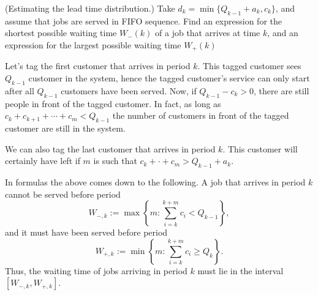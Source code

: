 \begin{question} (Estimating the lead time distribution.)  Take
  $d_k = \min\{Q_{k-1}+a_k, c_k\}$, and assume that jobs are served in
  FIFO sequence. Find an expression for the shortest possible waiting
  time $W_-(k)$ of a job that arrives at time $k$, and an expression
  for the largest possible waiting time $W_+(k)$
    \begin{solution}
      Let's tag the first customer that arrives in period $k$. This
      tagged customer sees $Q_{k-1}$ customer in the system, hence the
      tagged customer's service can only start after all $Q_{k-1}$
      customers have been served.  Now, if $Q_{k-1}-c_k >0$, there are
      still people in front of the tagged customer. In fact, as long
      as $c_k+c_{k+1}+\cdots +c_m < Q_{k-1}$ the number of customers in
      front of the tagged customer are still in the system.

      We can also tag the last customer that arrives in period
      $k$. This customer will certainly have left if $m$ is such that
      $c_k+\cdot+c_m > Q_{k-1}+a_k$.

      In formulas the above comes down to the following.  A job that
      arrives in period $k$ cannot be served before period
    \begin{equation*}
    W_{-,k}:= \max\left\{m: \sum_{i=k}^{k+m} c_i < Q_{k-1}\right\},
    \end{equation*}
    and it must have been served before period
    \begin{equation*}
      W_{+,k}:= \min\left\{m: \sum_{i=k}^{k+m} c_i \geq
        Q_{k}\right\}.
    \end{equation*}
    Thus, the waiting time of jobs arriving in period $k$ must lie in
    the interval $[W_{-,k}, W_{+,k}]$.
  \end{solution}
\end{question}

